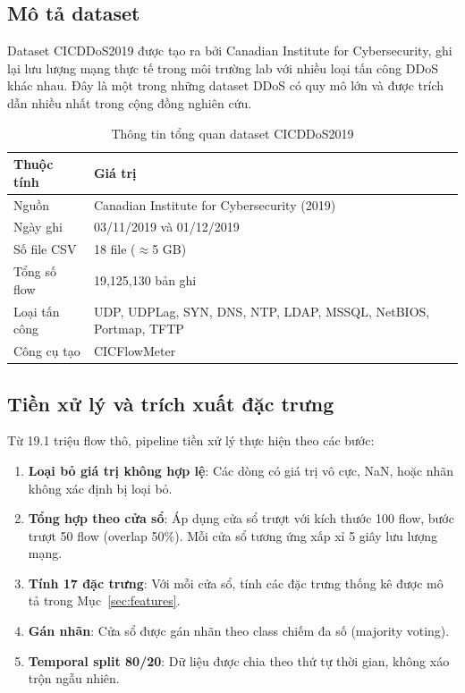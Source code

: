 \documentclass[12pt,a4paper]{article}
\begin{document}
\subsection{Mô tả dataset}

Dataset CICDDoS2019 \cite{sharafaldin2019} được tạo ra bởi Canadian Institute for Cybersecurity, ghi lại lưu lượng mạng thực tế trong môi trường lab với nhiều loại tấn công DDoS khác nhau. Đây là một trong những dataset DDoS có quy mô lớn và được trích dẫn nhiều nhất trong cộng đồng nghiên cứu.

\begin{table}[H]
\centering
\caption{Thông tin tổng quan dataset CICDDoS2019}
\label{tab:dataset}
\begin{tabular}{p{5cm}p{9cm}}
\toprule
\textbf{Thuộc tính} & \textbf{Giá trị} \\
\midrule
Nguồn               & Canadian Institute for Cybersecurity (2019) \\
Ngày ghi            & 03/11/2019 và 01/12/2019 \\
Số file CSV         & 18 file ($\approx$5 GB) \\
Tổng số flow        & 19,125,130 bản ghi \\
Loại tấn công       & UDP, UDPLag, SYN, DNS, NTP, LDAP, MSSQL, NetBIOS, Portmap, TFTP \\
Công cụ tạo         & CICFlowMeter \\
\bottomrule
\end{tabular}
\end{table}

\subsection{Tiền xử lý và trích xuất đặc trưng}

Từ 19.1 triệu flow thô, pipeline tiền xử lý thực hiện theo các bước:

\begin{enumerate}[leftmargin=2em]
\item \textbf{Loại bỏ giá trị không hợp lệ}: Các dòng có giá trị vô cực, NaN, hoặc nhãn không xác định bị loại bỏ.
\item \textbf{Tổng hợp theo cửa sổ}: Áp dụng cửa sổ trượt với kích thước 100 flow, bước trượt 50 flow (overlap 50\%). Mỗi cửa sổ tương ứng xấp xỉ 5 giây lưu lượng mạng.
\item \textbf{Tính 17 đặc trưng}: Với mỗi cửa sổ, tính các đặc trưng thống kê được mô tả trong Mục~\ref{sec:features}.
\item \textbf{Gán nhãn}: Cửa sổ được gán nhãn theo class chiếm đa số (majority voting).
\item \textbf{Temporal split 80/20}: Dữ liệu được chia theo thứ tự thời gian, không xáo trộn ngẫu nhiên.
\end{enumerate}
\end{document}
